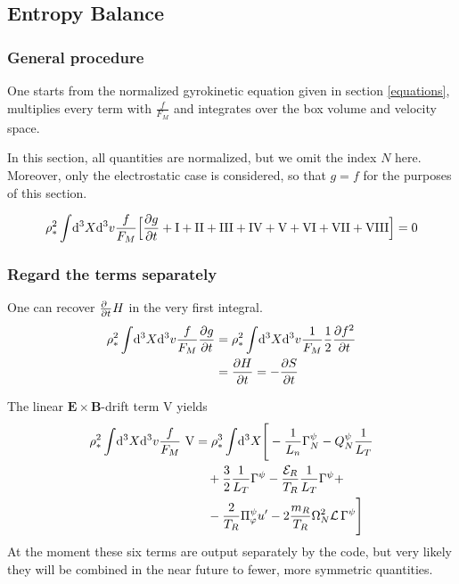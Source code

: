 \subsection{Entropy Balance\label{sec:entr-balance}}

\subsubsection*{General procedure} 
One starts from the normalized gyrokinetic equation given in section \ref{equations}, multiplies every term with $\frac{f}{F_M}$ and integrates over the box volume and velocity space.

In this section, all quantities are normalized, but we omit the index $N$ here. Moreover, only the electrostatic case is considered, so that $g = f$ for the purposes of this section.

\begin{align}\label{eq:entropy-balance}  
\rho_*^2\int\!\mathrm{d}^3X\mathrm{d}^3v\frac{f}{F_M}\Big[\frac{\partial g}{\partial t} +\mathrm{I} + \mathrm{II} + \mathrm{III} + \mathrm{IV} + \mathrm{V} + \mathrm{VI} + \mathrm{VII} + \mathrm{VIII}\Big] = 0 
\end{align}

\subsubsection*{Regard the terms separately}
One can recover $\frac{\partial \ }{\partial t} H$ in the very first integral.
\begin{align}
  \label{eq:dSdt}
  \rho_*^2\int\!\mathrm{d}^3X\mathrm{d}^3v\frac{f}{F_M}\frac{\partial g}{\partial t} &= \rho_*^2\int\!\mathrm{d}^3X\mathrm{d}^3v\frac{1}{F_M}\frac{1}{2}\frac{\partial f^2}{\partial t} \nonumber\\
&= \frac{\partial H}{\partial t} = - \frac{\partial S}{\partial t}
\end{align}

The linear $\mathbf{E}\times\mathbf{B}$-drift term V yields
\begin{align} 
  \rho_*^2\int\!\mathrm{d}^3X\mathrm{d}^3v\frac{f}{F_M}\ \mathrm{V} & = \rho_*^3\int\!\mathrm{d}^3X \Bigg[-\frac{1}{L_n}\Gamma_N^\psi - Q_N^\psi\frac{1}{L_T}\nonumber\\
  &\quad +\frac{3}{2}\frac{1}{L_T}\Gamma^\psi - \frac{\mathcal{E}_R}{T_R}\frac{1}{L_T}\Gamma^\psi +\nonumber\\
  &\quad - \frac{2}{T_R}\Pi_\varphi^\psi u^\prime
  - 2\frac{m_R}{T_R}\Omega_N^2\mathcal{L}\,\Gamma^\psi \Bigg]
\end{align}
At the moment these six terms are output separately by the code, but
very likely they will be combined in the near future to fewer, more
symmetric quantities.

